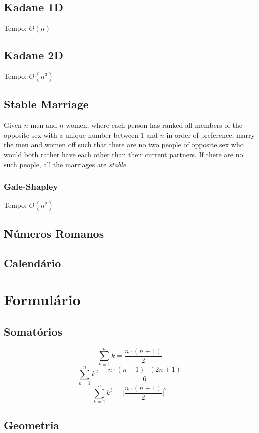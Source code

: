\documentclass[12pt,a4paper]{article}
\begin{document}
		\subsection{Kadane 1D}
			Tempo: \(\Theta(n)\)
			
		\subsection{Kadane 2D}
			Tempo: \(O(n^3)\)
			
		\subsection{Stable Marriage}
			Given $n$ men and $n$ women, where each person has ranked all members of the opposite sex with a unique number between $1$ and $n$ in order of preference, marry the men and women off such that there are no two people of opposite sex who would both rather have each other than their current partners. If there are no such people, all the marriages are \emph{stable}.
			\subsubsection{Gale-Shapley}
				Tempo: \(O(n^2)\)
				
		\subsection{Números Romanos}
			
		\subsection{Calendário}
			

	\twocolumn
	\section{Formulário}
		\subsection{Somatórios}
			\[ \sum_{k = 1}^{n} k = \frac{n \cdot (n + 1)}{2} \]
			\[ \sum_{k = 1}^{n} k^2 = \frac{n \cdot (n + 1) \cdot (2n + 1)}{6} \]
			\[ \sum_{k = 1}^{n} k^3 = \bigg[\frac{n \cdot (n + 1)}{2}\bigg]^2 \]
		\subsection{Geometria}
\end{document}
